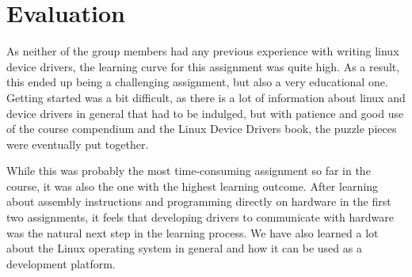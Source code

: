 \section{Evaluation}

As neither of the group members had any previous experience with writing linux device drivers, the learning curve for this assignment was quite high. As a result, this ended up being a challenging assignment, but also a very educational one. Getting started was a bit difficult, as there is a lot of information about linux and device drivers in general that had to be indulged, but with patience and good use of the course compendium and the Linux Device Drivers book, the puzzle pieces were eventually put together.

While this was probably the most time-consuming assignment so far in the course, it was also the one with the highest learning outcome. After learning about assembly instructions and programming directly on hardware in the first two assignments, it feels that developing drivers to communicate with hardware was the natural next step in the learning process. We have also learned a lot about the Linux operating system in general and how it can be used as a development platform.